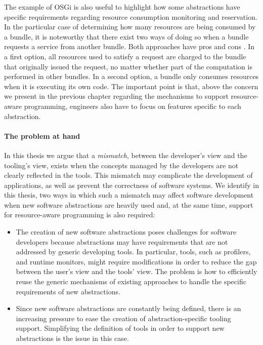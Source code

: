 The example of OSGi is also useful to highlight how some abstractions have specific requirements regarding resource consumption monitoring and reservation.
In the particular case of determining how many resources are being consumed by a bundle, it is noteworthy that there exist two ways of doing so when a bundle requests a service from another bundle.
Both approaches have pros and cons \cite{Miettinen2008,Maurel:2012:AME:2304736.2304763}.
In a first option, all resources used to satisfy a request are charged to the bundle that originally issued the request, no matter whether part of the computation is performed in other bundles.
In a second option, a bundle only consumes resources when it is executing its own code.
The important point is that, above the concern we present in the previous chapter regarding the mechanisms to support resource-aware programming, engineers also have to focus on features specific to each abstraction.

\paragraph{The problem at hand}
In this thesis we argue that a \textit{mismatch}, between the developer's view and the tooling's view, exists when the concepts managed by the developers are not clearly reflected in the tools.
This mismatch may complicate the development of applications, as well as prevent the correctness of software systems.
We identify in this thesis, two ways in which such a mismatch may affect software development when new software abstractions are heavily used and, at the same time, support for resource-aware programming is also required:

\begin{itemize}
\item The creation of new software abstractions poses challenges for software developers because abstractions may have requirements that are not addressed by generic developing tools.
In particular, tools, such as profilers, and runtime monitors, might require modifications in order to reduce the gap between the user's view and the tools' view.
The problem is how to efficiently reuse the generic mechanisms of existing approaches to handle the specific requirements of new abstractions.

\item Since new software abstractions are constantly being defined, there is an increasing pressure to ease the creation of abstraction-specific tooling support.
Simplifying the definition of tools in order to support new abstractions is the issue in this case. 
\end{itemize}

